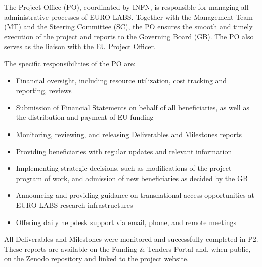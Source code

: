 
The Project Office (PO), coordinated by INFN, is responsible for managing all administrative processes of EURO-LABS. Together with the Management Team (MT) and the Steering Committee (SC), the PO ensures the smooth and timely execution of the project and reports to the Governing Board (GB). The PO also serves as the liaison with the EU Project Officer.

The specific responsibilities of the PO are:

\begin{itemize}
    \item Financial oversight, including resource utilization, cost tracking and reporting, reviews
    \item Submission of Financial Statements on behalf of all beneficiaries, as well as the distribution and payment of EU funding
    \item Monitoring, reviewing, and releasing Deliverables and Milestones reports
    \item Providing beneficiaries with regular updates and relevant information
    \item Implementing strategic decisions, such as modifications of the project program of work, and admission of new beneficiaries as decided by the GB
    \item Announcing and providing guidance on transnational access opportunities at EURO-LABS research infrastructures
    \item Offering daily helpdesk support via email, phone, and remote meetings
\end{itemize}

All Deliverables and Milestones were monitored and successfully completed in P2. These reports are available on the Funding \& Tenders Portal and, when public, on the Zenodo repository and linked to the project website.


